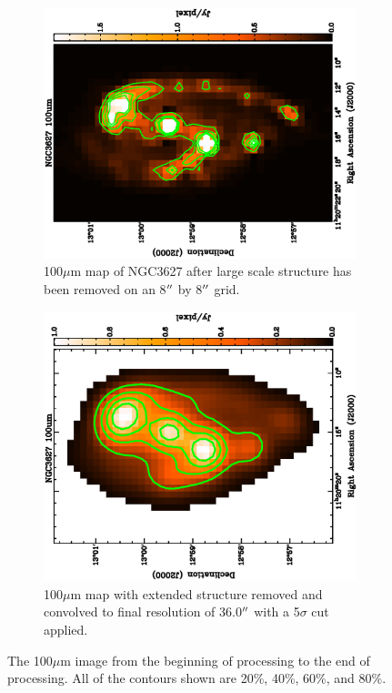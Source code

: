 \begin{figure}
  \begin{subfigure}[t]{.45\textwidth}
    \centering
    \includegraphics[width=1.\textwidth,angle=270]{obs_imgs/100_rem.eps}
    \caption{100$\mu$m map of NGC3627 after large scale structure has been removed on an 8$\mbox{$^{\prime\prime}$}$ by 8$\mbox{$^{\prime\prime}$}$ grid.}
  \end{subfigure}%
  \quad
  \begin{subfigure}[t]{0.45\textwidth}
    \centering
    \includegraphics[width=1.\textwidth,angle=270]{obs_imgs/100_sed_use.eps}
    \caption[100$\mu$m Filtering Steps]{100$\mu$m map with extended structure removed and convolved to final resolution of 36.0$\mbox{$^{\prime\prime}$}$ with a 5$\sigma$ cut applied.}
  \end{subfigure}
  \caption[100$\mu$m Filtering Steps]{The 100$\mu$m image from the beginning of processing to the end of processing.  All of the contours shown are 20\%, 40\%, 60\%, and 80\%.}
  \label{fig_100_transform}
\end{figure}
  

